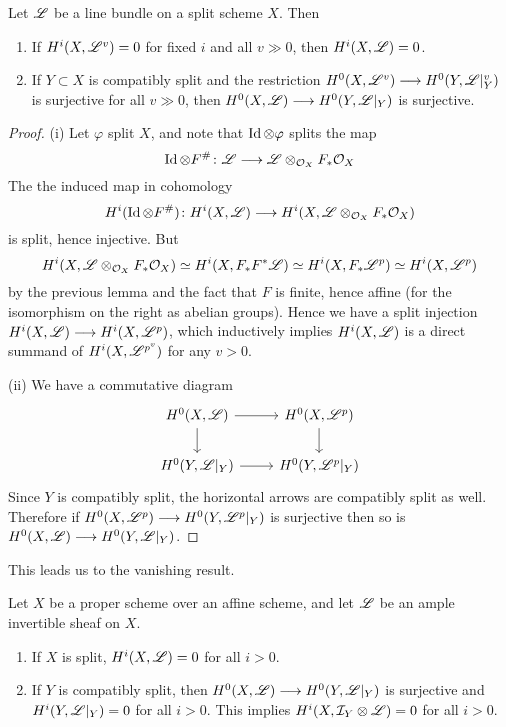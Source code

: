 \documentclass[12pt]{article}
\begin{document}
\begin{lem}\label{bklem1.2.7}
    Let $\mathscr{L}$ be a line bundle on a split scheme $X$. Then
    \begin{enumerate}[label=(\roman*)]
        \item If $H^i(X, \mathscr{L}^v) = 0$ for fixed $i$ and all $v \gg 0$, then $H^i(X, \mathscr{L}) = 0$.
        \item If $Y \subset X$ is compatibly split and the restriction $H^0(X, \mathscr{L}^v) \longrightarrow H^0(Y, \mathscr{L}\vert_Y^v)$ is surjective for all $v \gg 0$, then $H^0(X, \mathscr{L}) \longrightarrow H^0(Y, \mathscr{L}\vert_Y)$ is surjective.
    \end{enumerate}
\end{lem}
\begin{proof}
    (i) Let $\varphi$ split $X$, and note that $\operatorname{Id} \otimes \varphi$ splits the map
    \[\operatorname{Id} \otimes F^{\#} \colon \mathscr{L} \longrightarrow \mathscr{L} \otimes_{\mathcal{O}_X} F_*\mathcal{O}_X\]
    The the induced map in cohomology
    \[H^i(\operatorname{Id} \otimes F^{\#}) \colon H^i(X, \mathscr{L}) \longrightarrow H^i(X, \mathscr{L} \otimes_{\mathcal{O}_X} F_* \mathcal{O}_X)\]
    is split, hence injective. But
    \[H^i(X, \mathscr{L} \otimes_{\mathcal{O}_X} F_* \mathcal{O}_X) \simeq H^i(X, F_* F^* \mathscr{L}) \simeq H^i(X, F_* \mathscr{L}^p) \simeq H^i(X, \mathscr{L}^p)\]
    by the previous lemma and the fact that $F$ is finite, hence affine (for the isomorphism on the right as abelian groups). Hence we have a split injection $H^i(X, \mathscr{L}) \longrightarrow H^i(X, \mathscr{L}^p)$, which inductively implies $H^i(X, \mathscr{L})$ is a direct summand of $H^i(X, \mathscr{L}^{p^v})$ for any $v > 0$.

    (ii) We have a commutative diagram
    \[\begin{tikzcd}
	{H^0(X, \fanl)} & {H^0(X, \fanl^p)} \\
	{H^0(Y, \fanl\vert_Y)} & {H^0(Y, \fanl^p\vert_Y)}
	\arrow[from=1-1, to=1-2]
	\arrow[from=1-1, to=2-1]
	\arrow[from=1-2, to=2-2]
	\arrow[from=2-1, to=2-2]
\end{tikzcd}\]
Since $Y$ is compatibly split, the horizontal arrows are compatibly split as well. Therefore if $H^0(X, \mathscr{L}^p) \longrightarrow H^0(Y, \mathscr{L}^p\vert_Y)$ is surjective then so is $H^0(X, \mathscr{L}) \longrightarrow H^0(Y, \mathscr{L}\vert_Y)$.
\end{proof}
This leads us to the vanishing result.
\begin{thm}
    Let $X$ be a proper scheme over an affine scheme, and let $\mathscr{L}$ be an ample invertible sheaf on $X$.
    \begin{enumerate}
        \item If $X$ is split, $H^i(X, \mathscr{L}) = 0$ for all $i > 0$.
        \item If $Y$ is compatibly split, then $H^0(X,\mathscr{L}) \longrightarrow H^0(Y, \mathscr{L}\vert_Y)$ is surjective and $H^i(Y, \mathscr{L}\vert_Y) =0 $ for all $i > 0$. This implies $H^i(X, \mathcal{I}_Y \otimes \mathscr{L}) = 0$ for all $i > 0$.
    \end{enumerate}
\end{thm}
\end{document}
